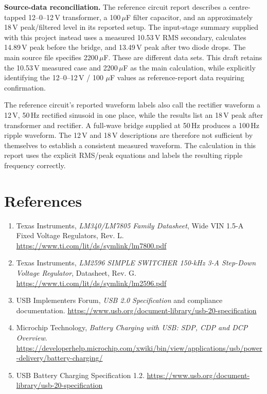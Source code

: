 \documentclass[journal,12pt,twocolumn]{IEEEtran}
\begin{document}
\textbf{Source-data reconciliation.}
The reference circuit report describes a centre-tapped 12--0--12\,V
transformer, a 100\,$\mu$F filter capacitor, and an approximately
18\,V peak/filtered level in its reported setup. The input-stage
summary supplied with this project instead uses a measured
10.53\,V RMS secondary, calculates 14.89\,V peak before the bridge,
and 13.49\,V peak after two diode drops. The main source file
specifies 2200\,$\mu$F. These are different data sets. This draft
retains the 10.53\,V measured case and 2200\,$\mu$F as the main
calculation, while explicitly identifying the 12--0--12\,V / 100
$\mu$F values as reference-report data requiring confirmation.

The reference circuit's reported waveform labels also call the
rectifier waveform a 12\,V, 50\,Hz rectified sinusoid in one place,
while the results list an 18\,V peak after transformer and
rectifier. A full-wave bridge supplied at 50\,Hz produces a
100\,Hz ripple waveform. The 12\,V and 18\,V descriptions are
therefore not sufficient by themselves to establish a consistent
measured waveform. The calculation in this report uses the explicit
RMS/peak equations and labels the resulting ripple frequency
correctly.

\section*{References}
\begin{enumerate}[leftmargin=1.5em]
    \item Texas Instruments, \emph{LM340/LM7805 Family Datasheet},
    Wide VIN 1.5-A Fixed Voltage Regulators, Rev. L.
    \url{https://www.ti.com/lit/ds/symlink/lm7800.pdf}
    \item Texas Instruments, \emph{LM2596 SIMPLE SWITCHER 150-kHz
    3-A Step-Down Voltage Regulator}, Datasheet, Rev. G.
    \url{https://www.ti.com/lit/ds/symlink/lm2596.pdf}
    \item USB Implementers Forum, \emph{USB 2.0 Specification}
    and compliance documentation.
    \url{https://www.usb.org/document-library/usb-20-specification}
    \item Microchip Technology, \emph{Battery Charging with USB:
    SDP, CDP and DCP Overview}.
    \url{https://developerhelp.microchip.com/xwiki/bin/view/applications/usb/power-delivery/battery-charging/}
    \item USB Battery Charging Specification 1.2.
    \url{https://www.usb.org/document-library/usb-20-specification}
\end{enumerate}
\end{document}
